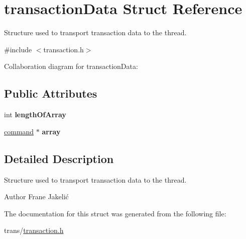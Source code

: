 \hypertarget{structtransactionData}{}\section{transaction\+Data Struct Reference}
\label{structtransactionData}


Structure used to transport transaction data to the thread.  




{\ttfamily \#include $<$transaction.\+h$>$}



Collaboration diagram for transaction\+Data\+:
\subsection*{Public Attributes}
\begin{DoxyCompactItemize}
\item 
int {\bfseries length\+Of\+Array}\hypertarget{structtransactionData_a07852cb012632b34732db8b4758e95af}{}\label{structtransactionData_a07852cb012632b34732db8b4758e95af}

\item 
\hyperlink{structAK__command__struct}{command} $\ast$ {\bfseries array}\hypertarget{structtransactionData_a131a5758b32a415a0c056c7496ca4ee8}{}\label{structtransactionData_a131a5758b32a415a0c056c7496ca4ee8}

\end{DoxyCompactItemize}


\subsection{Detailed Description}
Structure used to transport transaction data to the thread. 

\begin{DoxyAuthor}{Author}
Frane Jakelić 
\end{DoxyAuthor}


The documentation for this struct was generated from the following file\+:\begin{DoxyCompactItemize}
\item 
trans/\hyperlink{transaction_8h}{transaction.\+h}\end{DoxyCompactItemize}
